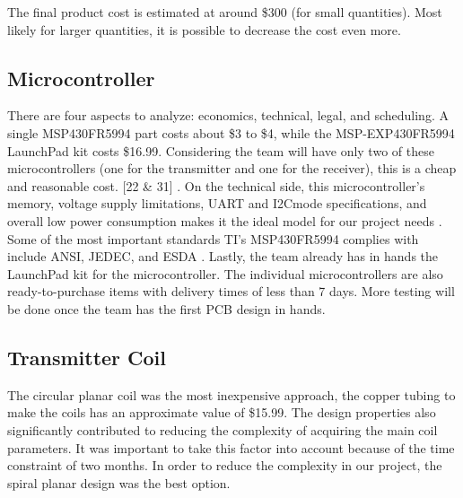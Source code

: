 \documentclass[12pt]{article}
\begin{document}
\indent
The final product cost is estimated at around \$300 (for small quantities). Most likely for larger quantities, it is possible to decrease the cost even more. 

\subsection{Microcontroller}

\indent \indent
There are four aspects to analyze: economics, technical, legal, and scheduling. A single MSP430FR5994 part costs about \$3 to \$4, while the MSP-EXP430FR5994 LaunchPad kit costs \$16.99. Considering the team will have only two of these microcontrollers (one for the transmitter and one for the receiver), this is a cheap and reasonable cost. [22 \& 31] \cite{MSP430FR599x}  \cite{testKit}. On the technical side, this microcontroller’s memory, voltage supply limitations, UART and I2Cmode specifications, and overall low power consumption makes it the ideal model for our project needs \cite{MSP430FR599x}. Some of the most important standards TI’s MSP430FR5994 complies with include ANSI, JEDEC, and ESDA \cite{MSP430FR599x}. Lastly, the team already has in hands the LaunchPad kit for the microcontroller. The individual microcontrollers are also ready-to-purchase items with delivery times of less than 7 days. More testing will be done once the team has the first PCB design in hands. 

\subsection{Transmitter Coil}


\indent \indent
The circular planar coil was the most inexpensive approach, the copper tubing to make the coils has an approximate value of  \$15.99. The design properties also significantly contributed to reducing the complexity of acquiring the main coil parameters. It was important to take this factor into account because of the time constraint of two months. In order to reduce the complexity in our project, the spiral planar design was the best option.\\
\end{document}
